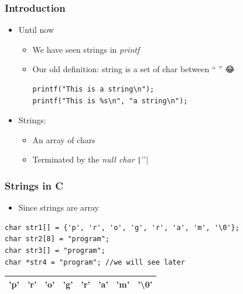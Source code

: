 \documentclass{../c-lecture}
\begin{document}
\begin{frame}[fragile]
  \frametitle{Introduction}
  \begin{itemize}
    \item Until now
    \begin{itemize}
      \item We have seen strings in \textit{\color{Cyan} printf}
      \item Our old definition: string is a set of char between `` '' 😂
      \begin{verbatim}
printf("This is a string\n");
printf("This is %s\n", "a string\n");
      \end{verbatim}
    \end{itemize}
    \item Strings:
    \begin{itemize}
      \item An array of chars
      \item Terminated by the \textit{\color{Orange} null char} \texttt|'\0'|
    \end{itemize}
  \end{itemize}
\end{frame}

\begin{frame}[fragile]
  \frametitle{Strings in C}
  \begin{itemize}
    \item Since strings are array
  \end{itemize}
  \begin{verbatim}
char str1[] = {'p', 'r', 'o', 'g', 'r', 'a', 'm', '\0'};
char str2[8] = "program";
char str3[] = "program";
char *str4 = "program"; //we will see later
  \end{verbatim}
  \begin{table}
  \begin{tabular}{*{8}{c}}
    \toprule
    'p' &
    'r' &
    'o' &
    'g' &
    'r' &
    'a' &
    'm' &
    {\color{Orange} '\textbackslash 0'} \\
    \bottomrule
  \end{tabular}
  \end{table}
\end{frame}
\end{document}
